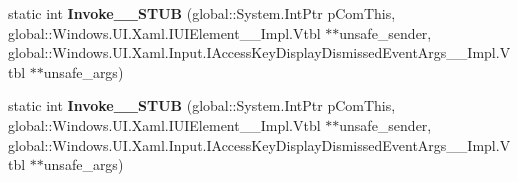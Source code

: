 \begin{DoxyCompactItemize}
static int {\bfseries Invoke\+\_\+\+\_\+\+S\+T\+UB} (global\+::\+System.\+Int\+Ptr p\+Com\+This, global\+::\+Windows.\+U\+I.\+Xaml.\+I\+U\+I\+Element\+\_\+\+\_\+\+Impl.\+Vtbl $\ast$$\ast$unsafe\+\_\+sender, global\+::\+Windows.\+U\+I.\+Xaml.\+Input.\+I\+Access\+Key\+Display\+Dismissed\+Event\+Args\+\_\+\+\_\+\+Impl.\+Vtbl $\ast$$\ast$unsafe\+\_\+args)
\item 
\mbox{\label{struct_windows_1_1_foundation_1_1_typed_event_handler___a___windows___u_i___xaml___u_i_element__d3bbe6abc1f0f1df72766f3122d9fe94_ad08d7f925d90701e0fb4baeb76f8c309}} 
static int {\bfseries Invoke\+\_\+\+\_\+\+S\+T\+UB} (global\+::\+System.\+Int\+Ptr p\+Com\+This, global\+::\+Windows.\+U\+I.\+Xaml.\+I\+U\+I\+Element\+\_\+\+\_\+\+Impl.\+Vtbl $\ast$$\ast$unsafe\+\_\+sender, global\+::\+Windows.\+U\+I.\+Xaml.\+Input.\+I\+Access\+Key\+Display\+Dismissed\+Event\+Args\+\_\+\+\_\+\+Impl.\+Vtbl $\ast$$\ast$unsafe\+\_\+args)
\end{DoxyCompactItemize}
